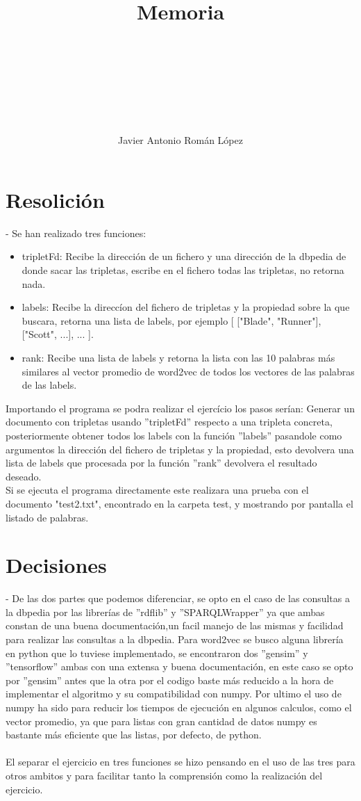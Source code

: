 \documentclass[12pt,a4paper]{article}
\author{\\\\\\\\\\\\\\Javier Antonio Román López}
\title{\huge{\textbf{Memoria}}}
\begin{document}
\maketitle
\newpage 

\section{Resolición}
- Se han realizado tres funciones:
	\begin{itemize}
	\item tripletFd: Recibe la dirección de un fichero y una dirección de la dbpedia de donde sacar las tripletas, escribe en el fichero todas las tripletas, no retorna nada.
	\item labels: Recibe la direccíon del fichero de tripletas y la propiedad sobre la que buscara, retorna una lista de labels, por ejemplo [ ["Blade", "Runner"], ["Scott", ...], ... ].
	\item rank: Recibe una lista de labels y retorna la lista con las 10 palabras más similares al vector promedio de word2vec de todos los vectores de las palabras de las labels.
	\end{itemize}
Importando el programa se podra realizar el ejercício los pasos serían: Generar un documento con tripletas usando ''tripletFd'' respecto a una tripleta concreta, posteriormente obtener todos los labels con la función ''labels'' pasandole como argumentos la dirección del fichero de tripletas y la propiedad, esto devolvera una lista de labels que procesada por la función ''rank'' devolvera el resultado deseado.\\
Si se ejecuta el programa directamente este realizara una prueba con el documento "test2.txt", encontrado en la carpeta test, y mostrando por pantalla el listado de palabras.

\section{Decisiones}
- De las dos partes que podemos diferenciar, se opto en el caso de las consultas a la dbpedia por las librerías de ''rdflib'' y ''SPARQLWrapper'' ya que ambas constan de una buena documentación,un facil manejo de las mismas y facilidad para realizar las consultas a la dbpedia. Para word2vec se busco alguna librería en python que lo tuviese implementado, se encontraron dos ''gensim'' y ''tensorflow'' ambas con una extensa y buena documentación, en este caso se opto por ''gensim'' antes que la otra por el codigo baste más reducido a la hora de implementar el algoritmo y su compatibilidad con numpy. Por ultimo el uso de numpy ha sido para reducir los tiempos de ejecución en algunos calculos, como el vector promedio, ya que para listas con gran cantidad de datos numpy es bastante más eficiente que las listas, por defecto, de python.\\\\
El separar el ejercicio en tres funciones se hizo pensando en el uso de las tres para otros ambitos y para facilitar tanto la comprensión como la realización del ejercicio.
\end{document}

